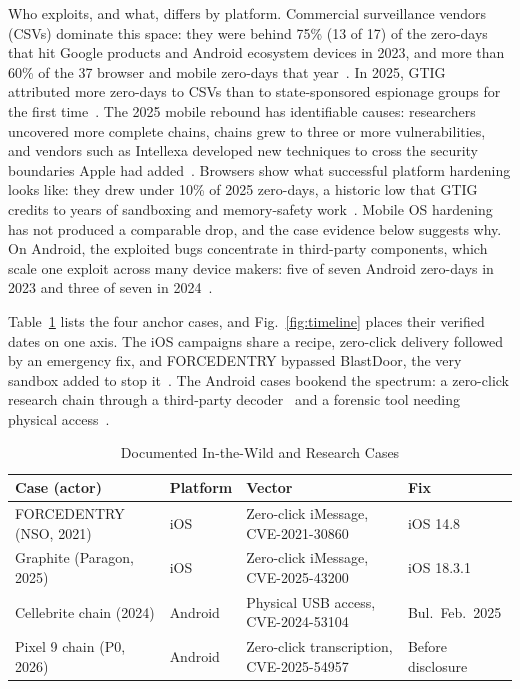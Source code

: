 \documentclass[conference,a4paper]{IEEEtran}
\begin{document}
Who exploits, and what, differs by platform. Commercial surveillance
vendors (CSVs) dominate this space: they were behind 75\% (13 of 17) of
the zero-days that hit Google products and Android ecosystem devices in
2023, and more than 60\% of the 37 browser and mobile zero-days that
year~\cite{gtig2023review}. In 2025, GTIG attributed more zero-days to
CSVs than to state-sponsored espionage groups for the first
time~\cite{gtig2026review}. The 2025 mobile rebound has identifiable
causes: researchers uncovered more complete chains, chains grew to three
or more vulnerabilities, and vendors such as Intellexa developed new
techniques to cross the security boundaries Apple had
added~\cite{gtig2026review}. Browsers show what successful platform
hardening looks like: they drew under 10\% of 2025 zero-days, a historic
low that GTIG credits to years of sandboxing and memory-safety
work~\cite{gtig2026review}. Mobile OS hardening has not produced a
comparable drop, and the case evidence below suggests why. On Android,
the exploited bugs concentrate in
third-party components, which scale one exploit across many device
makers: five of seven Android zero-days in 2023 and three of seven in
2024~\cite{charrier2025zeroday}.

Table~\ref{tab:cases} lists the four anchor cases, and
Fig.~\ref{fig:timeline} places their verified dates on one axis. The iOS
campaigns share a recipe, zero-click delivery followed by an emergency
fix, and FORCEDENTRY bypassed BlastDoor, the very sandbox added to stop
it~\cite{marczak2021forcedentry}. The Android cases bookend the spectrum:
a zero-click research chain through a third-party
decoder~\cite{silvanovich2026pixel} and a forensic tool needing physical
access~\cite{charrier2025zeroday}.

\begin{table}[htbp]
\caption{Documented In-the-Wild and Research Cases}
\begin{center}
\begin{tabular}{@{}p{2.1cm}p{1.1cm}p{2.3cm}p{1.25cm}@{}}
\toprule
\textbf{Case (actor)} & \textbf{Platform} & \textbf{Vector} & \textbf{Fix} \\
\midrule
FORCEDENTRY (NSO, 2021) & iOS & Zero-click iMessage, CVE-2021-30860 & iOS 14.8 \\
Graphite (Paragon, 2025) & iOS & Zero-click iMessage, CVE-2025-43200 & iOS 18.3.1 \\
Cellebrite chain (2024) & Android & Physical USB access, CVE-2024-53104 & Bul.\ Feb.\ 2025 \\
Pixel 9 chain (P0, 2026) & Android & Zero-click transcription, CVE-2025-54957 & Before disclosure \\
\bottomrule
\end{tabular}
\label{tab:cases}
\end{center}
\end{table}
\end{document}
